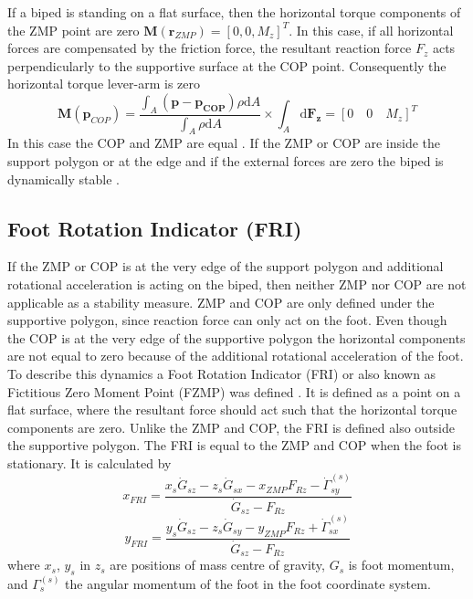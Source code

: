 \documentclass[12pt,a4paper,twoside]{article}
\newcommand{\vvc}[1]{{\bm{#1}}}
\begin{document}
If a biped is standing on a flat surface, then the horizontal torque components of the ZMP point are zero $\vvc M(\bm{r}_{ZMP}) = \left[0, 0, M_z \right]^T$. In this case, if all horizontal forces are compensated by the friction force, the resultant reaction force $F_{z}$ acts perpendicularly to the supportive surface at the COP point. Consequently the horizontal torque lever-arm is zero
\begin{equation}
\bm{M}(\bm{p}_{COP})= \frac{\int_A (\bm{p} - \bm{p_{COP}}) \rho \mathrm{d}A}{\int_A \rho \mathrm{d}A} \times \int_A \mathrm{d}\bm{F_{z}} = [0 \quad 0 \quad M_{z}]^{T}
\label{e11}
\end{equation}
In this case the COP and ZMP are equal \cite{Goswami1999,Popovic2005}. If the ZMP or COP are inside the support polygon or at the edge and if the external forces are zero the biped is dynamically stable \cite{Vukobratovic1969,Huang2001,Arakawa1997}.


\subsection{Foot Rotation Indicator (FRI)}
If the ZMP or COP is at the very edge of the support polygon and additional rotational acceleration is acting on the biped, then neither ZMP nor COP are not applicable as a stability measure. ZMP and COP are only defined under the supportive polygon, since reaction force can only act on the foot. Even though the COP is at the very edge of the supportive polygon the horizontal components are not equal to zero because of the additional rotational acceleration of the foot. To describe this dynamics a Foot Rotation Indicator (FRI) or also known as Fictitious Zero Moment Point (FZMP) was defined \cite{Vukobratovic2004}. It is defined as a point on a flat surface, where the resultant force should act such that the horizontal torque components are zero. Unlike the ZMP and COP, the FRI is defined also outside the supportive polygon. The FRI is equal to the ZMP and COP when the foot is stationary. It is calculated by
\begin{equation}
x_{FRI} = \frac{x_{s}\dot{G}_{sz} - z_{s}\dot{G}_{sx} - x_{ZMP}F_{Rz} - \dot{\Gamma}_{sy}^{(s)}} {\dot{G}_{sz} - F_{Rz}}
\label{e12}
\end{equation}
\begin{equation}
y_{FRI} = \frac{y_{s}\dot{G}_{sz} - z_{s}\dot{G}_{sy} - y_{ZMP}F_{Rz} + \dot{\Gamma}_{sx}^{(s)}} {\dot{G}_{sz} - F_{Rz}}
\label{e13}
\end{equation}
where $x_s$, $y_s$ in $z_s$ are positions of mass centre of gravity, $G_s$ is foot momentum, and $\Gamma_s^{(s)}$ the angular momentum of the foot in the foot coordinate system. 
\end{document}
